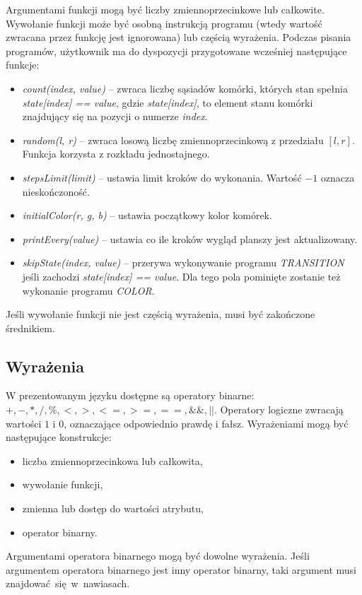 \documentclass[declaration,shortabstract, inz]{iithesis}
\theoremstyle{definition} \newtheorem{definition}{Definicja}[]
\theoremstyle{plain} \newtheorem{remark}[definition]{Obserwacja}
\theoremstyle{plain} \newtheorem{theorem}[definition]{Twierdzenie}
\theoremstyle{plain} \newtheorem{example}{Przykład}[definition]
\theoremstyle{plain} \newtheorem{lemma}[definition]{Lemat}
\begin{document}
Argumentami funkcji mogą być liczby zmiennoprzecinkowe lub całkowite. Wywołanie funkcji może być osobną instrukcją programu (wtedy wartość zwracana przez funkcję jest ignorowana) lub częścią wyrażenia.
Podczas pisania programów, użytkownik ma do dyspozycji przygotowane wcześniej następujące funkcje:
\begin{itemize}
\item \textit{count(index, value)} -- zwraca liczbę sąsiadów komórki, których stan spełnia \textit{state[index] == value}, gdzie \textit{state[index]}, to element stanu komórki znajdujący się na pozycji o numerze \textit{index}.
\item \textit{random(l, r)} -- zwraca losową liczbę zmiennoprzecinkową z przedziału $[l, r]$. Funkcja korzysta z rozkładu jednostajnego.
\item \textit{stepsLimit(limit)} -- ustawia limit kroków do wykonania. Wartość $-1$ oznacza nieskończoność.
\item \textit{initialColor(r, g, b)} -- ustawia początkowy kolor komórek.
\item \textit{printEvery(value)} -- ustawia co ile kroków wygląd planszy jest aktualizowany.
\item \textit{skipState(index, value)} -- przerywa wykonywanie programu \textit{TRANSITION} jeśli zachodzi \textit{state[index] == value}. Dla tego pola pominięte zostanie też wykonanie programu \textit{COLOR}.
\end{itemize}

Jeśli wywołanie funkcji nie jest częścią wyrażenia, musi być zakończone średnikiem.

\subsection{Wyrażenia}
W prezentowanym języku dostępne są operatory binarne: $+, -, * , /, \%, <, >, <=, >=, ==, \&\&, ||$.
Operatory logiczne zwracają wartości $1$ i $0$, oznaczające odpowiednio prawdę i fałsz.
Wyrażeniami mogą być następujące konstrukcje:
\begin{itemize}
\item liczba zmiennoprzecinkowa lub całkowita,
\item wywołanie funkcji,
\item zmienna lub dostęp do wartości atrybutu,
\item operator binarny.
\end{itemize}
Argumentami operatora binarnego mogą być dowolne wyrażenia. Jeśli argumentem operatora binarnego jest inny operator binarny, taki argument musi znajdować~się~w~nawiasach.
\end{document}
